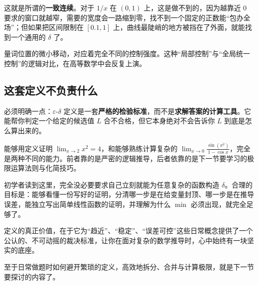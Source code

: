 这就是所谓的\textbf{一致连续}。对于 \(1/x\) 在 \((0,1)\) 上，这是做不到的，因为越靠近 \(0\) 要求的窗口就越窄，需要的宽度会一路缩到零，找不到一个固定的正数能``包办全场''；但如果把区间限制在 \([0.1,1]\) 上，曲线最陡峭的地方被挡在了外面，就能找到一个通用的 \(\delta\) 了。

量词位置的微小移动，对应着完全不同的控制强度。这种``局部控制''与``全局统一控制''的逻辑对比，在高等数学中会反复上演。

\subsection{这套定义不负责什么}

必须明确一点：\(\varepsilon\)-\(\delta\) 定义是一套\textbf{严格的检验标准}，而不是\textbf{求解答案的计算工具}。它能帮你判定一个给定的候选值 \(L\) 合不合格，但它本身绝对不会告诉你 \(L\) 到底是怎么算出来的。

能够用定义证明 \(\lim_{x\to2}x^2=4\)，和能够熟练计算复杂的 \(\lim_{x\to0}\frac{\sin(x^2)}{1-\cos x}\)，完全是两种不同的能力。前者靠的是严密的逻辑推导，后者依靠的是下一节要学习的极限运算法则与化简技巧。

初学者读到这里，完全没必要要求自己立刻就能为任意复杂的函数构造 \(\delta\)。合理的目标是：能够看懂一份写好的证明，分清哪一步是在给变量封顶、哪一步是在推导误差，能独立写出简单线性函数的证明，并理解为什么 \(\min\) 必须出现，就完全足够了。

定义的真正价值，在于它为``趋近''、``稳定''、``误差可控''这些日常概念提供了一个公认的、不可动摇的裁决标准，让你在面对复杂的数学推导时，心中始终有一块坚实的底座。

至于日常做题时如何避开繁琐的定义，高效地拆分、合并与计算极限，就是下一节要探讨的内容了。
